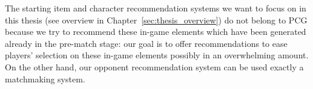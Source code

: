 The starting item and character recommendation systems we want to focus on in this thesis (see overview in Chapter~\ref{sec:thesis_overview}) do not belong to PCG because we try to recommend these in-game elements which have been generated already in the pre-match stage: our goal is to offer recommendations to ease players' selection on these in-game elements possibly in an overwhelming amount. On the other hand, our opponent recommendation system can be used exactly a matchmaking system. 





